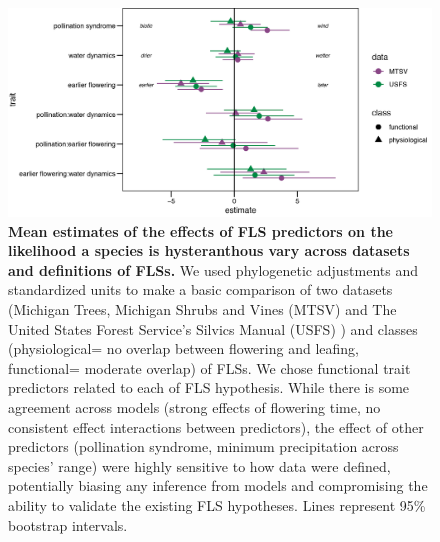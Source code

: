 \documentclass[11pt]{article}
\begin{document}
\begin{figure}[H]
    \centering
 \includegraphics[width=\textwidth]{..//..//MTSV_USFS/MTSV_USFS.png} 
    \caption{\textbf{Mean estimates of the effects of FLS predictors on the likelihood a species is hysteranthous vary across datasets and definitions of FLSs.}  We used phylogenetic adjustments and standardized units to make a basic comparison of two datasets (Michigan Trees, Michigan Shrubs and Vines (MTSV) \citep{Barnes2004,Barnes2016} and The United States Forest Service's Silvics Manual (USFS) \citep{Burns1990}) and classes (physiological= no overlap between flowering and leafing, functional= moderate overlap) of FLSs. We chose functional trait predictors related to each of FLS hypothesis. While there is some agreement across models (strong effects of flowering time, no consistent effect interactions between predictors), the effect of other predictors (pollination syndrome, minimum precipitation across species' range) were highly sensitive to how data were defined, potentially biasing any inference from models and compromising the ability to validate the existing FLS hypotheses. Lines represent 95\% bootstrap intervals.}
    \label{fig:muplots.USMT}
\end{figure}
\end{document}
